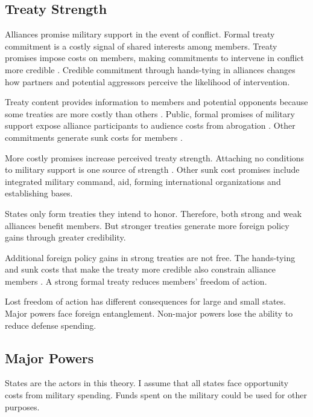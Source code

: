 \documentclass[12pt]{article}
\begin{document}
\subsection{Treaty Strength} 


Alliances promise military support in the event of conflict. 
Formal treaty commitment is a costly signal of shared interests among members.
Treaty promises impose costs on members, making commitments to intervene in conflict more credible \citep{Fearon1997, Morrow2000}. 
Credible commitment through hands-tying in alliances changes how partners and potential aggressors perceive the likelihood of intervention. 


Treaty content provides information to members and potential opponents because some treaties are more costly than others \citep{Leeds2003}. 
Public, formal promises of military support expose alliance participants to audience costs from abrogation \citep{Morrow2000}.
Other commitments generate sunk costs for members \citep{Morrow2000}.


More costly promises increase perceived treaty strength. 
Attaching no conditions to military support is one source of strength \citep{Benson2012}.
Other sunk cost promises include integrated military command, aid, forming international organizations and establishing bases. 


States only form treaties they intend to honor.
Therefore, both strong and weak alliances benefit members.  
But stronger treaties generate more foreign policy gains through greater credibility. 


Additional foreign policy gains in strong treaties are not free. 
The hands-tying and sunk costs that make the treaty more credible also constrain alliance members \citep{Schelling1985}.
A strong formal treaty reduces members' freedom of action.  


Lost freedom of action has different consequences for large and small states. 
Major powers face foreign entanglement. 
Non-major powers lose the ability to reduce defense spending. 


\subsection{Major Powers}


States are the actors in this theory. 
I assume that all states face opportunity costs from military spending. 
Funds spent on the military could be used for other purposes.
\end{document}
